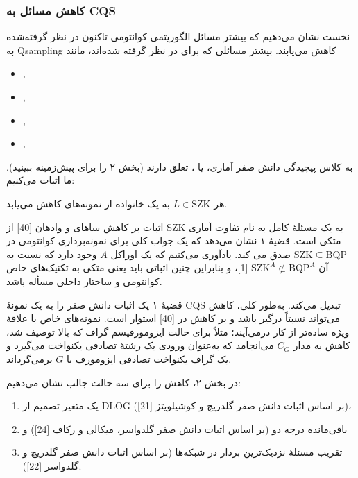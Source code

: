 \subsubsection*{کاهش مسائل به CQS}
نخست نشان می‌دهیم که بیشتر مسائل الگوریتمی کوانتومی تاکنون در نظر گرفته‌شده به Qsampling کاهش می‌یابند. بیشتر مسائلی که برای  در نظر گرفته شده‌اند، مانند
\begin{itemize}
	\item 
	,
	\item
	,
	\item
	, 
	\item
	,
\end{itemize}
به کلاس پیچیدگی دانش صفر آماری، یا ، تعلق دارند (بخش ۲ را برای پیش‌زمینه ببینید).
ما اثبات می‌کنیم:

\begin{thm}\label{thm 1}
هر $L \in \mathrm{SZK}$ به یک خانواده از نمونه‌های  کاهش می‌یابد.
\end{thm}
اثبات بر کاهش ساهای و وادهان [40] از SZK به یک مسئلهٔ کامل به نام تفاوت آماری متکی است. قضیهٔ ۱ نشان می‌دهد که یک جواب کلی برای نمونه‌برداری کوانتومی در
$\mathrm{SZK} \subseteq \mathrm{BQP}$
صدق می کند. یادآوری می‌کنیم که یک اوراکل $A$ وجود دارد که نسبت به آن $\mathrm{SZK}^A \not\subset \mathrm{BQP}^A$ [1]، و بنابراین چنین اثباتی باید 
یعنی متکی به تکنیک‌های خاص کوانتومی و ساختار داخلی مسأله باشد.

قضیهٔ ۱ یک اثبات دانش صفر را به یک نمونهٔ CQS تبدیل می‌کند. به‌طور کلی، کاهش می‌تواند نسبتاً درگیر باشد و بر کاهش در [40] استوار است. نمونه‌های خاص با علاقهٔ ویژه ساده‌تر از کار درمی‌آیند؛ مثلاً برای حالت ایزومورفیسم گراف که بالا توصیف شد، کاهش به مدار $C_G$ می‌انجامد که به‌عنوان ورودی یک رشتهٔ تصادفی یکنواخت می‌گیرد و یک گراف یکنواخت تصادفی ایزومورف با $G$ برمی‌گرداند. 

در بخش ۲، کاهش را برای سه حالت جالب نشان می‌دهیم: 

\begin{enumerate}
	\item
	یک متغیر تصمیم از DLOG (بر اساس اثبات دانش صفر گلدریچ و کوشیلویتز [21])، 
	\item
	باقی‌مانده درجه دو (بر اساس اثبات دانش صفر گلدواسر، میکالی و رکاف [24]) و 
	\item
	تقریب مسئلهٔ نزدیک‌ترین بردار در شبکه‌ها (بر اساس اثبات دانش صفر گلدریچ و گلدواسر [22]).
\end{enumerate}

